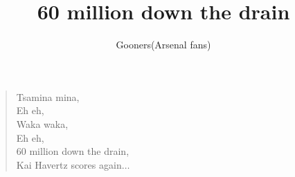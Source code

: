 \documentclass[a4paper,12pt]{article}
\title{60 million down the drain}
\author{Gooners(Arsenal fans)}
\date{}
\begin{document}
	
	\maketitle
	
	\begin{verse}
		
		Tsamina mina, \\ 
		Eh eh, \\
		Waka waka, \\
		Eh eh, \\
		60 million down the drain, \\
		Kai Havertz scores again$\ldots$
		
	\end{verse}
	
\end{document}

